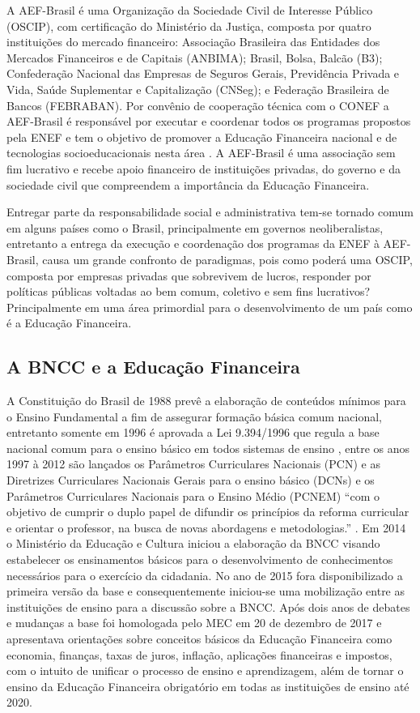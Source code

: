 A AEF-Brasil é uma Organização da Sociedade Civil de Interesse Público (OSCIP), com certificação do Ministério da Justiça, composta por quatro instituições do mercado financeiro: Associação Brasileira das Entidades dos Mercados Financeiros e de Capitais (ANBIMA); Brasil, Bolsa, Balcão (B3); Confederação Nacional das Empresas de Seguros Gerais, Previdência Privada e Vida, Saúde Suplementar e Capitalização (CNSeg); e Federação Brasileira de Bancos (FEBRABAN). Por convênio de cooperação técnica com o CONEF a AEF-Brasil é responsável por executar e coordenar todos os programas propostos pela ENEF e tem o objetivo de promover a Educação Financeira nacional e de tecnologias socioeducacionais nesta área \cite{aefbrasil2011}. A AEF-Brasil é uma  associação sem fim lucrativo e recebe apoio financeiro de instituições privadas, do governo e da sociedade civil que compreendem a importância da Educação Financeira.

Entregar parte da responsabilidade social e administrativa tem-se tornado comum em alguns países como o Brasil, principalmente em governos neoliberalistas, entretanto a entrega da execução e coordenação dos programas da ENEF à AEF-Brasil, causa um grande confronto de paradigmas, pois como poderá uma OSCIP, composta por empresas privadas que sobrevivem de lucros, responder por políticas públicas voltadas ao bem comum, coletivo e sem fins lucrativos? Principalmente em uma área primordial para o desenvolvimento de um país como é a Educação Financeira.

\subsection{A BNCC e a Educação Financeira}
A Constituição do Brasil de 1988 prevê a elaboração de conteúdos mínimos para o Ensino Fundamental a fim de assegurar formação básica comum nacional, entretanto somente em 1996 é aprovada a Lei 9.394/1996 que regula a base nacional comum para o ensino básico em todos sistemas de ensino \cite{brasil1996}, entre os anos 1997 à 2012 são lançados os Parâmetros Curriculares Nacionais (PCN) e as Diretrizes Curriculares Nacionais Gerais para o ensino básico (DCNs) e os Parâmetros Curriculares Nacionais para o Ensino Médio (PCNEM) “com o objetivo de cumprir o duplo papel de difundir os princípios da reforma curricular e orientar o professor, na busca de novas abordagens e metodologias.” \cite{brasil2017b}. Em 2014 o Ministério da Educação e Cultura iniciou a elaboração da BNCC visando estabelecer os ensinamentos básicos para o desenvolvimento de conhecimentos necessários para o exercício da cidadania. No ano de 2015 fora disponibilizado a primeira versão da base e consequentemente iniciou-se uma mobilização entre as instituições de ensino para a discussão sobre a BNCC. Após dois anos de debates e mudanças a base foi homologada pelo MEC em 20 de dezembro de 2017 e apresentava orientações sobre conceitos básicos da Educação Financeira como economia, finanças, taxas de juros, inflação, aplicações financeiras e impostos, com o intuito de unificar o processo de ensino e aprendizagem, além de tornar o ensino da Educação Financeira obrigatório em todas as instituições de ensino até 2020.

